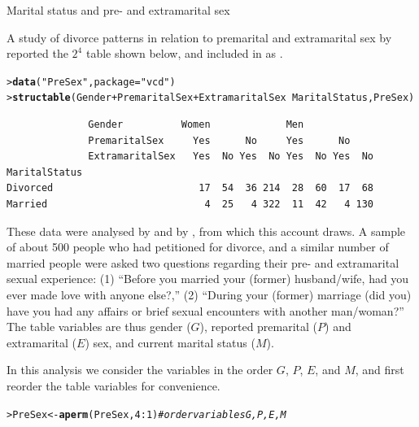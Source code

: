 \documentclass[10pt,krantz2]{krantz}\usepackage[]{graphicx}\usepackage[]{color}
\makeatletter
\newcommand{\hlnum}[1]{\textcolor[rgb]{0.686,0.059,0.569}{#1}}%
\newcommand{\hlstr}[1]{\textcolor[rgb]{0.192,0.494,0.8}{#1}}%
\newcommand{\hlcom}[1]{\textcolor[rgb]{0.678,0.584,0.686}{\textit{#1}}}%
\newcommand{\hlopt}[1]{\textcolor[rgb]{0,0,0}{#1}}%
\newcommand{\hlstd}[1]{\textcolor[rgb]{0.345,0.345,0.345}{#1}}%
\newcommand{\hlkwb}[1]{\textcolor[rgb]{0.69,0.353,0.396}{#1}}%
\newcommand{\hlkwc}[1]{\textcolor[rgb]{0.333,0.667,0.333}{#1}}%
\newcommand{\hlkwd}[1]{\textcolor[rgb]{0.737,0.353,0.396}{\textbf{#1}}}%
\newenvironment{kframe}{%
 \def\at@end@of@kframe{}%
 \ifinner\ifhmode%
  \def\at@end@of@kframe{\end{minipage}}%
  \begin{minipage}{\columnwidth}%
 \fi\fi%
 \def\FrameCommand##1{\hskip\@totalleftmargin \hskip-\fboxsep
 \colorbox{shadecolor}{##1}\hskip-\fboxsep
     \hskip-\linewidth \hskip-\@totalleftmargin \hskip\columnwidth}%
 \MakeFramed {\advance\hsize-\width
   \@totalleftmargin\z@ \linewidth\hsize
   \@setminipage}}%
 {\par\unskip\endMakeFramed%
 \at@end@of@kframe}
\newenvironment{knitrout}{}{} %
\renewenvironment{knitrout}{\small\renewcommand{\baselinestretch}{.85}}{} %
\makeatother
\begin{document}
\begin{Example}[marital1]{Marital status and pre- and extramarital sex}

A study of divorce patterns in relation to premarital and extramarital sex
by \citet{ThornesCollard:79} reported
the \(2^4\) table shown below, and included in  as
.

\begin{knitrout}
\color{fgcolor}\begin{kframe}
\begin{alltt}
\hlstd{> }\hlkwd{data}\hlstd{(}\hlstr{"PreSex"}\hlstd{,} \hlkwc{package} \hlstd{=} \hlstr{"vcd"}\hlstd{)}
\hlstd{> }\hlkwd{structable}\hlstd{(Gender} \hlopt{+} \hlstd{PremaritalSex} \hlopt{+} \hlstd{ExtramaritalSex} \hlopt{~} \hlstd{MaritalStatus, PreSex)}
\end{alltt}
\begin{verbatim}
              Gender          Women             Men            
              PremaritalSex     Yes      No     Yes      No    
              ExtramaritalSex   Yes  No Yes  No Yes  No Yes  No
MaritalStatus                                                  
Divorced                         17  54  36 214  28  60  17  68
Married                           4  25   4 322  11  42   4 130
\end{verbatim}
\end{kframe}
\end{knitrout}

These data were analysed by \citet[\S 6.1.7]{Agresti:2013}
and by \citet{Friendly:94a,Friendly:00:VCD}, from which this account draws.
A sample of
about 500 people who had petitioned for divorce, and a similar number
of married people were asked two questions regarding their pre- and
extramarital sexual experience:  (1) ``Before you married your
(former) husband/wife, had you ever made love with anyone else?,''
(2) ``During your (former) marriage (did you) have you had any
affairs or brief sexual encounters with another man/woman?''
The
table variables are thus gender ($G$), reported premarital ($P$)
and extramarital ($E$) sex, and current marital status ($M$).

In this analysis we consider the variables in the order $G$, $P$,
$E$, and $M$, and first reorder the table variables for
convenience.
\begin{knitrout}
\color{fgcolor}\begin{kframe}
\begin{alltt}
\hlstd{> }\hlstd{PreSex} \hlkwb{<-} \hlkwd{aperm}\hlstd{(PreSex,} \hlnum{4} \hlopt{:} \hlnum{1}\hlstd{)}   \hlcom{# order variables G, P, E, M}
\end{alltt}
\end{kframe}
\end{knitrout}



\end{Example}
\end{document}
